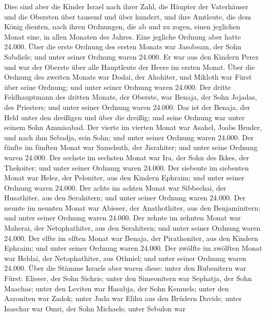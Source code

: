  Dies sind aber die Kinder Israel nach ihrer Zahl, die
Häupter der Vaterhäuser und die Obersten über tausend und über hundert,
und ihre Amtleute, die dem König dienten, nach ihren Ordnungen, die ab
und zu zogen, einen jeglichen Monat eine, in allen Monaten des Jahres.
Eine jegliche Ordnung aber hatte 24.000.  Über die erste
Ordnung des ersten Monats war Jasobeam, der Sohn Sabdiels; und unter
seiner Ordnung waren 24.000.  Er war aus den Kindern Perez
und war der Oberste über alle Hauptleute der Heere im ersten Monat.
 Über die Ordnung des zweiten Monats war Dodai, der
Ahohiter, und Mikloth war Fürst über seine Ordnung; und unter seiner
Ordnung waren 24.000.  Der dritte Feldhauptmann des
dritten Monats, der Oberste, war Benaja, der Sohn Jojadas, des
Priesters; und unter seiner Ordnung waren 24.000.  Das ist
der Benaja, der Held unter den dreißigen und über die dreißig; und seine
Ordnung war unter seinem Sohn Ammisabad.  Der vierte im
vierten Monat war Asahel, Joabs Bruder, und nach ihm Sebadja, sein Sohn;
und unter seiner Ordnung waren 24.000.  Der fünfte im
fünften Monat war Samehuth, der Jisrahiter; und unter seine Ordnung
waren 24.000.  Der sechste im sechsten Monat war Ira, der
Sohn des Ikkes, der Thekoiter; und unter seiner Ordnung waren 24.000.
 Der siebente im siebenten Monat war Helez, der
Peloniter, aus den Kindern Ephraim; und unter seiner Ordnung waren
24.000.  Der achte im achten Monat war Sibbechai, der
Husathiter, aus den Serahitern; und unter seiner Ordnung waren 24.000.
 Der neunte im neunten Monat war Abieser, der
Anathothiter, aus den Benjaminitern; und unter seiner Ordnung waren
24.000.  Der zehnte im zehnten Monat war Maherai, der
Netophathiter, aus den Serahitern; und unter seiner Ordnung waren
24.000.  Der elfte im elften Monat war Benaja, der
Pirathoniter, aus den Kindern Ephraim; und unter seiner Ordnung waren
24.000.  Der zwölfte im zwölften Monat war Heldai, der
Netophathiter, aus Othniel; und unter seiner Ordnung waren 24.000.
 Über die Stämme Israels aber waren diese: unter den
Rubenitern war Fürst: Elieser, der Sohn Sichris; unter den Simeonitern
war Sephatja, der Sohn Maachas;  unter den Leviten war
Hasabja, der Sohn Kemuels; unter den Aaroniten war Zadok;
 unter Juda war Elihu aus den Brüdern Davids; unter
Isaschar war Omri, der Sohn Michaels;  unter Sebulon war
